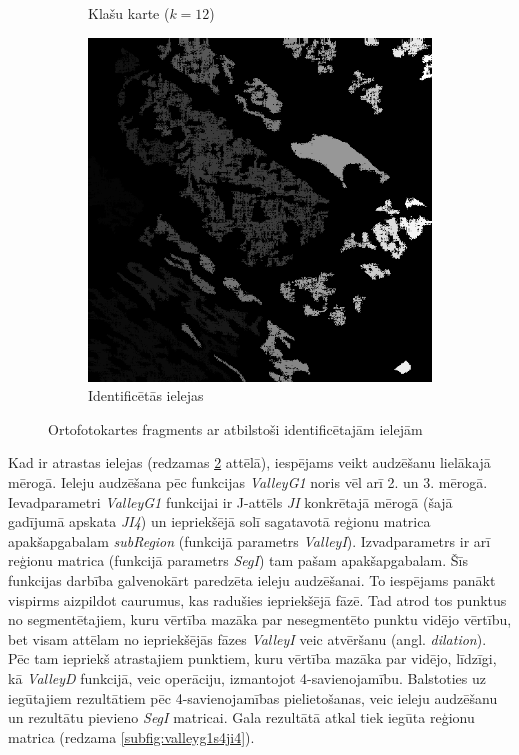 \documentclass[12pt,paper=a4]{report}
\begin{document}
\begin{figure}[h!]
\begin{subfigure}[b]{.3\linewidth}
\caption{Klašu karte ($k=12$)}
\end{subfigure}
\begin{subfigure}[b]{.3\linewidth}
\includegraphics[width=\linewidth]{regionPecValleyD}
\caption{Identificētās ielejas}
\label{subfig:valleyd}
\end{subfigure}
\caption{Ortofotokartes fragments ar atbilstoši identificētajām ielejām}
\end{figure}
Kad ir atrastas ielejas (redzamas \ref{subfig:valleyd} attēlā), iespējams veikt audzēšanu lielākajā mērogā. Ieleju audzēšana pēc funkcijas \textit{ValleyG1} noris vēl arī 2. un 3. mērogā. Ievadparametri \textit{ValleyG1} funkcijai ir J-attēls \textit{JI} konkrētajā mērogā (šajā gadījumā apskata \textit{JI4}) un iepriekšējā solī sagatavotā reģionu matrica apakšapgabalam \textit{subRegion} (funkcijā parametrs \textit{ValleyI}). Izvadparametrs ir arī reģionu matrica (funkcijā parametrs \textit{SegI}) tam pašam apakšapgabalam. Šīs funkcijas darbība galvenokārt paredzēta ieleju audzēšanai. To iespējams panākt vispirms aizpildot caurumus, kas radušies iepriekšējā fāzē. Tad atrod tos punktus no segmentētajiem, kuru vērtība mazāka par nesegmentēto punktu vidējo vērtību, bet visam attēlam no iepriekšējās fāzes \textit{ValleyI} veic atvēršanu (angl. \textit{dilation}). Pēc tam iepriekš atrastajiem punktiem, kuru vērtība mazāka par vidējo, līdzīgi, kā \textit{ValleyD} funkcijā, veic operāciju, izmantojot 4-savienojamību. Balstoties uz iegūtajiem rezultātiem pēc 4-savienojamības pielietošanas, veic ieleju audzēšanu un rezultātu pievieno \textit{SegI} matricai. Gala rezultātā atkal tiek iegūta reģionu matrica (redzama \ref{subfig:valleyg1s4ji4}). 
\end{document}

